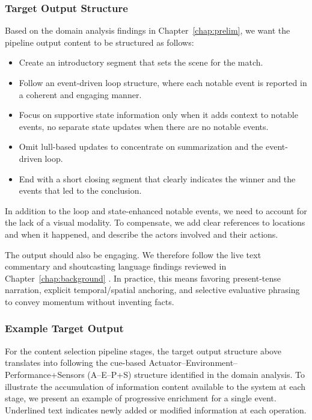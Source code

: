 \subsubsection*{Target Output Structure}
Based on the domain analysis findings in Chapter~\ref{chap:prelim}, we want the pipeline output content to be structured as follows:
\begin{itemize}
  \item Create an introductory segment that sets the scene for the match.
  \item Follow an event-driven loop structure, where each notable event is reported in a coherent and engaging manner.
  \item Focus on supportive state information only when it adds context to notable events, no separate state updates when there are no notable events.
  \item Omit lull-based updates to concentrate on summarization and the event-driven loop.
  \item End with a short closing segment that clearly indicates the winner and the events that led to the conclusion.
\end{itemize}

In addition to the loop and state-enhanced notable events, we need to account for the lack of a visual modality. To compensate, we add clear references to locations and when it happened, and describe the actors involved and their actions.

The output should also be engaging. We therefore follow the live text commentary and shoutcasting language findings reviewed in Chapter~\ref{chap:background} \cite{lewandowski2012,pavzanin2022,byro2017,gustin2020}. In practice, this means favoring present-tense narration, explicit temporal/spatial anchoring, and selective evaluative phrasing to convey momentum without inventing facts.

\subsubsection*{Example Target Output}

For the content selection pipeline stages, the target output structure above translates into following the cue-based Actuator--Environment--Performance+Sensors (A--E--P+S) structure identified in the domain analysis. To illustrate the accumulation of information content available to the system at each stage, we present an example of progressive enrichment for a single event. Underlined text indicates newly added or modified information at each operation.

